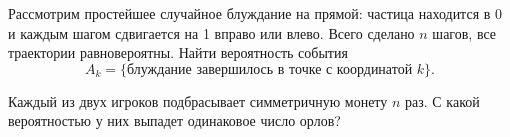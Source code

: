 \documentclass{article}
\begin{document}
\begin{enumerate_boxed}
        \item Рассмотрим простейшее случайное блуждание на прямой: частица находится в 0 и каждым шагом сдвигается на 1 вправо или влево.
        Всего сделано $n$ шагов, все траектории равновероятны.
        Найти вероятность события \[A_k = \{\text{блуждание завершилось в точке с координатой $k$}\}.\]

        \item Каждый из двух игроков подбрасывает симметричную монету $n$ раз.
        С какой вероятностью у них выпадет одинаковое число орлов?

    \end{enumerate_boxed}
\end{document}
